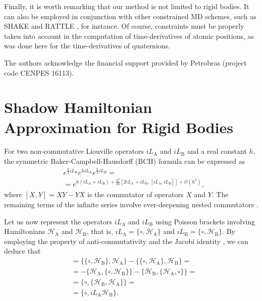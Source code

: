 \documentclass[
	aip,
	jcp,
	reprint,
]{revtex4-1}
\newcommand{\Ham}[1]{{\mathcal H}_\text{#1}}           %
\newcommand{\Liu}[1]{i\!L_\text{#1}}                   %
\newcommand{\timestep}{h}
\begin{document}
Finally, it is worth remarking that our method is not limited to rigid bodies.
It can also be employed in conjunction with other constrained MD schemes, such as SHAKE \cite{Ryckaert_1977} and RATTLE \cite{Andersen_1983}, for instance.
Of course, constraints must be properly taken into account in the computation of time-derivatives of atomic positions, as was done here for the time-derivatives of quaternions.

\begin{acknowledgements}
The authors acknowledge the financial support provided by Petrobras (project code CENPES 16113).
\end{acknowledgements}

\appendix

\section{Shadow Hamiltonian Approximation for Rigid Bodies}
\label{sec:rigid body shadow hamiltonian}

For two non-commutative Liouville operators $\Liu A$ and $\Liu B$ and a real constant $\timestep$, the symmetric Baker-Campbell-Hausdorff (BCH) formula can be expressed as \cite{Hairer_2006}
\begin{equation}
\label{eq:symmetric BCH}
\begin{split}
&e^{\frac{\timestep}{2} \Liu B} e^{\timestep \Liu A} e^{\frac{\timestep}{2} \Liu B} = \\
&= e^{\timestep (\Liu A + \Liu B) + \frac{\timestep^3}{24} \left[2 \Liu A + \Liu B,[\Liu A,\Liu B]\right] + \mathcal{O}(\timestep^5)},
\end{split}
\end{equation}
where $[X,Y] = XY - YX$ is the commutator of operators $X$ and $Y$.
The remaining terms of the infinite series involve ever-deepening nested commutators \cite{Hairer_2006}.

Let us now represent the operators $\Liu A$ and $\Liu B$ using Poisson brackets involving Hamiltonians $\Ham A$ and $\Ham B$, that is, $\Liu A = \{\circ,\Ham A\}$ and $\Liu B = \{\circ,\Ham B\}$.
By employing the property of anti-commutativity and the Jacobi identity \cite{Hairer_2006}, we can deduce that
\begin{align*}
[\Liu A,\Liu B] &= \{\{\circ,\Ham B\},\Ham A\} - \{\{\circ,\Ham A\},\Ham B\} = \\
&= -\{\Ham A,\{\circ,\Ham B\}\} - \{\Ham B,\{\Ham A,\circ\}\} = \\
&= \{\circ,\{\Ham B,\Ham A\}\} = \\
&= \{\circ,{\Liu A} {\Ham B}\}.
\end{align*}
\end{document}
